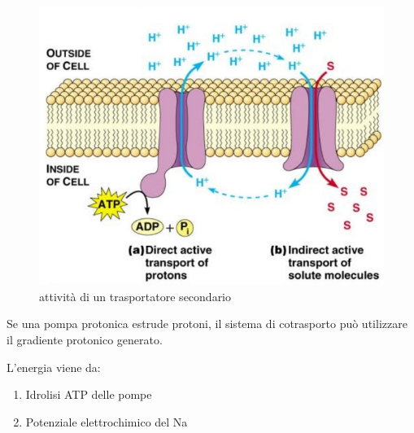 \documentclass[a4paper,12pt]{article}
\begin{document}
\begin{figure}[H]
\centering
\includegraphics[scale=0.3]{immagine/cotrasporto.jpg}
\caption{attività di un trasportatore secondario}
\end{figure}

Se una pompa
protonica estrude protoni, il sistema di cotrasporto può utilizzare il gradiente protonico
generato.

L'energia viene da:
\begin{enumerate}
\item{Idrolisi ATP delle pompe}
\item{Potenziale elettrochimico del Na}
\end{enumerate}
\end{document}
